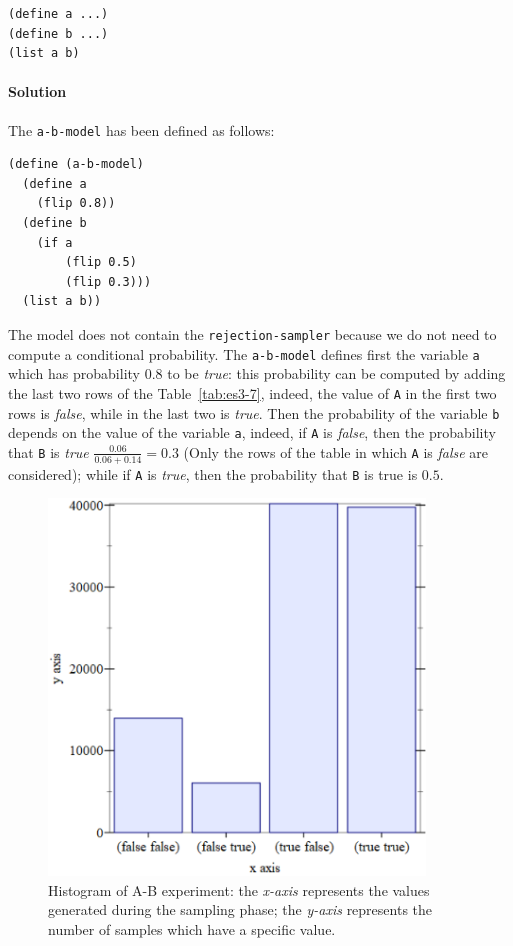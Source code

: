 \begin{lstlisting}
(define a ...)
(define b ...)
(list a b)
\end{lstlisting}

\paragraph{Solution}
The \texttt{a-b-model} has been defined as follows:
\begin{lstlisting}[caption={Model to compute the probabilities of A and B}, captionpos=b]
(define (a-b-model)
  (define a
    (flip 0.8))
  (define b
    (if a
        (flip 0.5)
        (flip 0.3)))
  (list a b))
\end{lstlisting}
The model does not contain the \texttt{rejection-sampler} because we do not need to compute a conditional probability.
The \texttt{a-b-model} defines first the variable \texttt{a} which has probability $0.8$ to be \textit{true}:
this probability can be computed by adding the last two rows of the Table~\ref{tab:es3-7}, indeed, the value of \texttt{A} in
the first two rows is \textit{false}, while in the last two is \textit{true}.
Then the probability of the variable \texttt{b} depends on the value of the variable \texttt{a}, indeed, if \texttt{A} is 
\textit{false}, then the probability that \texttt{B} is \textit{true} $ \frac{0.06}{0.06 + 0.14} = 0.3 $ (Only the rows of the table
in which \texttt{A} is \textit{false} are considered); while if \texttt{A} is \textit{true}, then the probability that \texttt{B}
is true is $ 0.5 $.

\begin{figure}[h]
    \centering
    \includegraphics[width=10cm]{images/3.7.png}
    \caption{
        Histogram of A-B experiment: the \textit{x-axis} represents the values generated during the sampling phase; 
        the \textit{y-axis} represents the number of samples which have a specific value.
    }
    \label{fig:3-7}
\end{figure}

